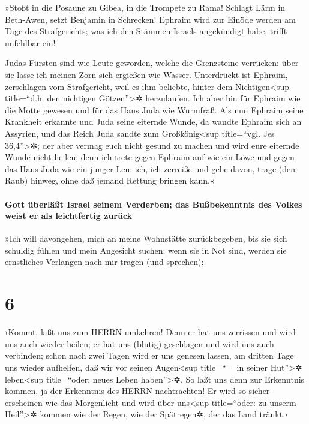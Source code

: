  »Stoßt in die Posaune zu Gibea, in die Trompete zu Rama!
Schlagt Lärm in Beth-Awen, setzt Benjamin in Schrecken! 
Ephraim wird zur Einöde werden am Tage des Strafgerichts; was ich den
Stämmen Israels angekündigt habe, trifft unfehlbar ein!

 Judas Fürsten sind wie Leute geworden, welche die
Grenzsteine verrücken: über sie lasse ich meinen Zorn sich ergießen wie
Wasser.  Unterdrückt ist Ephraim, zerschlagen vom
Strafgericht, weil es ihm beliebte, hinter dem Nichtigen\textless sup
title=``d.h. den nichtigen Götzen''\textgreater✲ herzulaufen.
 Ich aber bin für Ephraim wie die Motte gewesen und für
das Haus Juda wie Wurmfraß.  Als nun Ephraim seine
Krankheit erkannte und Juda seine eiternde Wunde, da wandte Ephraim sich
an Assyrien, und das Reich Juda sandte zum Großkönig\textless sup
title=``vgl. Jes 36,4''\textgreater✲; der aber vermag euch nicht gesund
zu machen und wird eure eiternde Wunde nicht heilen; 
denn ich trete gegen Ephraim auf wie ein Löwe und gegen das Haus Juda
wie ein junger Leu: ich, ich zerreiße und gehe davon, trage (den Raub)
hinweg, ohne daß jemand Rettung bringen kann.«

\hypertarget{gott-uxfcberluxe4uxdft-israel-seinem-verderben-das-buuxdfbekenntnis-des-volkes-weist-er-als-leichtfertig-zuruxfcck}{%
\paragraph{Gott überläßt Israel seinem Verderben; das Bußbekenntnis des
Volkes weist er als leichtfertig
zurück}\label{gott-uxfcberluxe4uxdft-israel-seinem-verderben-das-buuxdfbekenntnis-des-volkes-weist-er-als-leichtfertig-zuruxfcck}}

 »Ich will davongehen, mich an meine Wohnstätte
zurückbegeben, bis sie sich schuldig fühlen und mein Angesicht suchen;
wenn sie in Not sind, werden sie ernstliches Verlangen nach mir tragen
(und sprechen):

\hypertarget{section-5}{%
\section{6}\label{section-5}}

 ›Kommt, laßt uns zum HERRN umkehren! Denn er hat uns
zerrissen und wird uns auch wieder heilen; er hat uns (blutig)
geschlagen und wird uns auch verbinden;  schon nach zwei
Tagen wird er uns genesen lassen, am dritten Tage uns wieder aufhelfen,
daß wir vor seinen Augen\textless sup title=``=~in seiner
Hut''\textgreater✲ leben\textless sup title=``oder: neues Leben
haben''\textgreater✲.  So laßt uns denn zur Erkenntnis
kommen, ja der Erkenntnis des HERRN nachtrachten! Er wird so sicher
erscheinen wie das Morgenlicht und wird über uns\textless sup
title=``oder: zu unserm Heil''\textgreater✲ kommen wie der Regen, wie
der Spätregen✲, der das Land tränkt.‹

